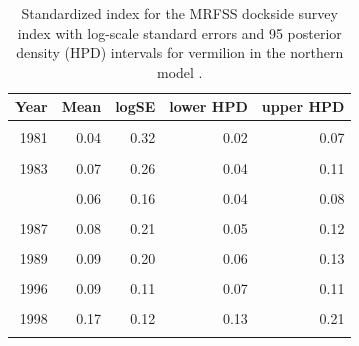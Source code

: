 \documentclass[
  english,
  a4paper,
]{article}
\begin{document}
\begin{table}

\caption{\label{tab:tab-index-mrfss}Standardized index for the MRFSS dockside survey index with log-scale standard errors and 95%
       posterior density (HPD) intervals for vermilion in the northern model .}
\centering
\begin{tabular}[t]{rrrrr}
\toprule
Year & Mean & logSE & lower HPD & upper HPD\\
\midrule
\cellcolor{gray!6}{1980} & \cellcolor{gray!6}{0.05} & \cellcolor{gray!6}{0.21} & \cellcolor{gray!6}{0.04} & \cellcolor{gray!6}{0.08}\\
1981 & 0.04 & 0.32 & 0.02 & 0.07\\
\cellcolor{gray!6}{1982} & \cellcolor{gray!6}{0.05} & \cellcolor{gray!6}{0.23} & \cellcolor{gray!6}{0.03} & \cellcolor{gray!6}{0.07}\\
1983 & 0.07 & 0.26 & 0.04 & 0.11\\
\cellcolor{gray!6}{1984} & \cellcolor{gray!6}{0.09} & \cellcolor{gray!6}{0.20} & \cellcolor{gray!6}{0.06} & \cellcolor{gray!6}{0.13}\\
\addlinespace
1985 & 0.06 & 0.16 & 0.04 & 0.08\\
\cellcolor{gray!6}{1986} & \cellcolor{gray!6}{0.07} & \cellcolor{gray!6}{0.17} & \cellcolor{gray!6}{0.05} & \cellcolor{gray!6}{0.10}\\
1987 & 0.08 & 0.21 & 0.05 & 0.12\\
\cellcolor{gray!6}{1988} & \cellcolor{gray!6}{0.11} & \cellcolor{gray!6}{0.18} & \cellcolor{gray!6}{0.08} & \cellcolor{gray!6}{0.15}\\
1989 & 0.09 & 0.20 & 0.06 & 0.13\\
\addlinespace
\cellcolor{gray!6}{1995} & \cellcolor{gray!6}{0.08} & \cellcolor{gray!6}{0.19} & \cellcolor{gray!6}{0.05} & \cellcolor{gray!6}{0.12}\\
1996 & 0.09 & 0.11 & 0.07 & 0.11\\
\cellcolor{gray!6}{1997} & \cellcolor{gray!6}{0.23} & \cellcolor{gray!6}{0.11} & \cellcolor{gray!6}{0.18} & \cellcolor{gray!6}{0.29}\\
1998 & 0.17 & 0.12 & 0.13 & 0.21\\
\cellcolor{gray!6}{1999} & \cellcolor{gray!6}{0.09} & \cellcolor{gray!6}{0.12} & \cellcolor{gray!6}{0.07} & \cellcolor{gray!6}{0.11}\\
\bottomrule
\end{tabular}
\end{table}
\end{document}
